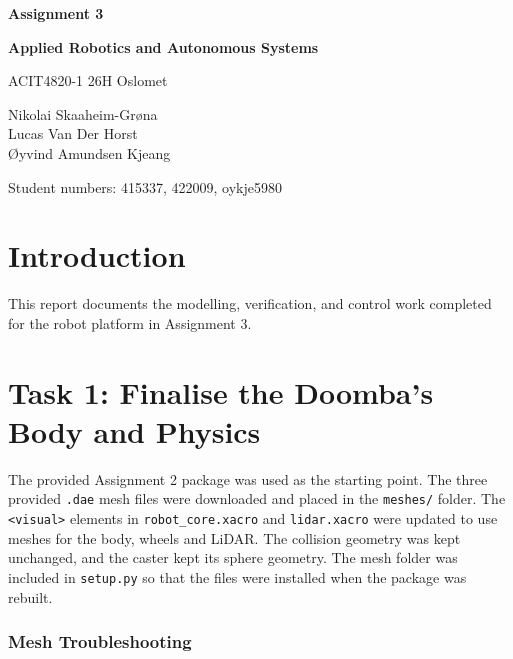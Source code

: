 \documentclass[10pt,a4paper]{article}
\begin{document}
\begin{center}
    {\LARGE \textbf{Assignment 3}}\\

    \vspace{0.15cm}

    {\Large \textbf{Applied Robotics and Autonomous Systems}}

    \vspace{0.3cm}

    ACIT4820-1 26H Oslomet

    \vspace{0.3cm}

    Nikolai Skaaheim-Grøna \\
    Lucas Van Der Horst \\
    Øyvind Amundsen Kjeang

    \vspace{0.3cm}

    Student numbers: 415337, 422009, oykje5980
\end{center}

\vspace{0.4cm}

\tableofcontents

\vspace{0.5cm}


\section{Introduction}

This report documents the modelling, verification, and control work completed for the robot platform in Assignment 3.

\section{Task 1: Finalise the Doomba's Body and Physics}

The provided Assignment 2 package was used as the starting point. The three provided \texttt{.dae} mesh files were downloaded and placed in the \texttt{meshes/} folder. The \texttt{<visual>} elements in \texttt{robot\_core.xacro} and \texttt{lidar.xacro} were updated to use meshes for the body, wheels and LiDAR. The collision geometry was kept unchanged, and the caster kept its sphere geometry. The mesh folder was included in \texttt{setup.py} so that the files were installed when the package was rebuilt.

\subsubsection*{Mesh Troubleshooting}
\end{document}
